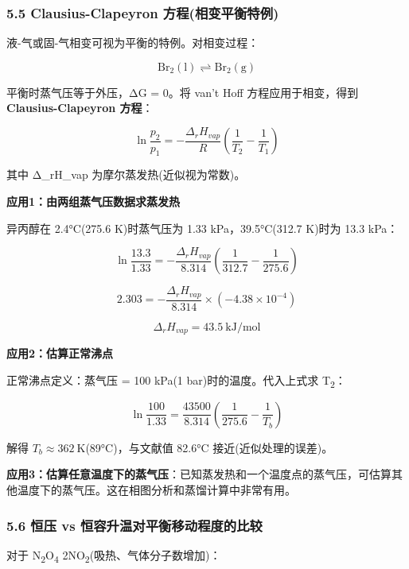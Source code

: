 \subsubsection{5.5 Clausius-Clapeyron 方程(相变平衡特例)}\label{clausius-clapeyron-ux65b9ux7a0bux76f8ux53d8ux5e73ux8861ux7279ux4f8b}

液-气或固-气相变可视为平衡的特例。对相变过程：

\[
\mathrm{Br_2(l) \rightleftharpoons Br_2(g)}
\]

平衡时蒸气压等于外压，ΔG = 0。将 van't Hoff 方程应用于相变，得到 \textbf{Clausius-Clapeyron 方程}：

\[
\boxed{\ln\frac{p_2}{p_1} = -\frac{\Delta_r H_{vap}}{R}\left(\frac{1}{T_2} - \frac{1}{T_1}\right)}
\]

其中 Δ\_rH\_vap 为摩尔蒸发热(近似视为常数)。

\textbf{应用1：由两组蒸气压数据求蒸发热}

异丙醇在 2.4°C(275.6 K)时蒸气压为 1.33 kPa，39.5°C(312.7 K)时为 13.3 kPa：

\[
\ln\frac{13.3}{1.33} = -\frac{\Delta_r H_{vap}}{8.314}\left(\frac{1}{312.7} - \frac{1}{275.6}\right)
\]

\[
2.303 = -\frac{\Delta_r H_{vap}}{8.314} \times (-4.38 \times 10^{-4})
\]

\[
\Delta_r H_{vap} = 43.5\ \mathrm{kJ/mol}
\]

\textbf{应用2：估算正常沸点}

正常沸点定义：蒸气压 = 100 kPa(1 bar)时的温度。代入上式求 T\textsubscript{2}：

\[
\ln\frac{100}{1.33} = \frac{43500}{8.314}\left(\frac{1}{275.6} - \frac{1}{T_b}\right)
\]

解得 \(T_b \approx 362\ \mathrm{K}\)(89°C)，与文献值 82.6°C 接近(近似处理的误差)。

\textbf{应用3：估算任意温度下的蒸气压}：已知蒸发热和一个温度点的蒸气压，可估算其他温度下的蒸气压。这在相图分析和蒸馏计算中非常有用。

\subsubsection{5.6 恒压 vs 恒容升温对平衡移动程度的比较}\label{ux6052ux538b-vs-ux6052ux5bb9ux5347ux6e29ux5bf9ux5e73ux8861ux79fbux52a8ux7a0bux5ea6ux7684ux6bd4ux8f83}

对于 N\textsubscript{2}O\textsubscript{4} \衡 2NO\textsubscript{2}(吸热、气体分子数增加)：

